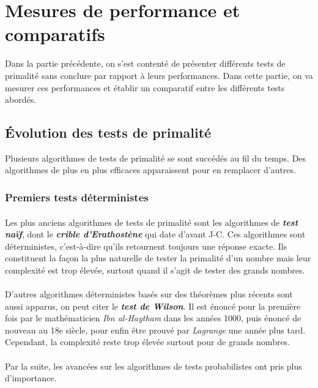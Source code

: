 \section{Mesures de performance et comparatifs}
	Dans la partie précédente, on s'est contenté de présenter différents tests de primalité sans conclure par rapport à leurs performances. Dans cette partie, on va mesurer ces performances et établir un comparatif entre les différents tests abordés.
	
	\subsection{Évolution des tests de primalité}
		Plusieurs algorithmes de tests de primalité se sont succédés au fil du temps. Des algorithmes de plus en plus efficaces apparaissent pour en remplacer d'autres.
	
		\subsubsection*{Premiers tests déterministes}
			\paragraph{}Les plus anciens algorithmes de tests de primalité sont les algorithmes de \textit{\textbf{test naïf}}, dont le \textit{\textbf{crible d'Erathostène}} qui date d'avant J-C. Ces algorithmes sont déterministes, c'est-à-dire qu'ils retournent toujours une réponse exacte. Ils constituent la façon la plus naturelle de tester la primalité d'un nombre mais leur complexité est trop élevée, surtout quand il s'agit de tester des grands nombres.
			
			\paragraph{}D'autres algorithmes déterministes basés sur des théorèmes plus récents sont aussi apparus, on peut citer le \textit{\textbf{test de Wilson}}. Il est énoncé pour la première fois par le mathématicien \textit{Ibn al-Haytham} dans les années 1000, puis énoncé de nouveau au 18e siècle, pour enfin être prouvé par \textit{Lagrange} une année plus tard. Cependant, la complexité reste trop élevée surtout pour de grands nombres.
			
			\paragraph{}\noindent Par la suite, les avancées sur les algorithmes de tests probabilistes ont pris plus d'importance.
		
